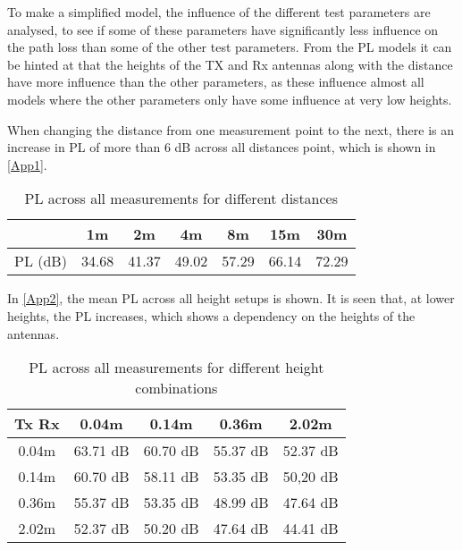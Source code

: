 
To make a simplified model, the influence of the different test parameters are analysed, to see if some of these parameters have significantly less influence on the path loss than some of the other test parameters. From the PL models it can be hinted at that the heights of the TX and Rx antennas along with the distance have more influence than the other parameters, as these influence almost all models where the other parameters only have some influence at very low heights.   


When changing the distance from one measurement point to the next, there is an increase in PL of more than 6 dB across all distances point, which is shown in \autoref{App1}.

\begin{table}[!htbp]
\centering
\begin{tabular}{|c|c|c|c|c|c|c|}
\hline
   & 1m & 2m & 4m & 8m & 15m & 30m\\
\hline
PL (dB)& 34.68 & 41.37 & 49.02 & 57.29 & 66.14 & 72.29 \\
\hline
\end{tabular}
\caption{PL across all measurements for different distances}
\label{App1}
\end{table}



In \autoref{App2}, the mean PL across all height setups is shown. It is seen that, at lower heights, the PL increases, which shows a dependency on the heights of the antennas.

\begin{table}[H]
\centering
\begin{tabular}{|c|c|c|c|c|}
\hline
Tx Rx & 0.04m & 0.14m & 0.36m & 2.02m \\
\hline
0.04m & 63.71 dB & 60.70 dB & 55.37 dB & 52.37 dB\\
\hline
0.14m & 60.70 dB & 58.11 dB & 53.35 dB & 50,20 dB\\
\hline
0.36m & 55.37 dB & 53.35 dB & 48.99 dB & 47.64 dB\\
\hline
2.02m & 52.37 dB & 50.20 dB & 47.64 dB & 44.41 dB\\
\hline
\end{tabular}
\caption{PL across all measurements for different height combinations}
\label{App2}
\end{table}


